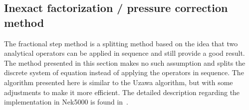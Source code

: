
\subsection{Inexact factorization / pressure correction method} \label{prescorr}
The fractional step method is a splitting method based on the idea that two analytical 
operators can be applied in sequence and still provide a good result. The method presented 
in this section makes no such assumption and splits the discrete system of equation instead 
of applying the operators in sequence. The algorithm presented here is similar to the Uzawa
algorithm, but with some adjustments to make it more efficient. The detailed 
description regarding the implementation in Nek5000 is found
in~\cite{Fischer_hybridschwarz-multigrid}.

